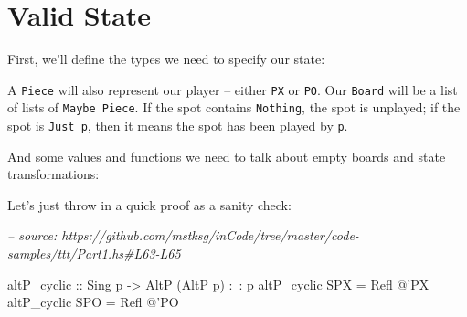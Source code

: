 \documentclass[]{article}
\newenvironment{Shaded}{}{}
\newcommand{\CommentTok}[1]{\textcolor[rgb]{0.38,0.63,0.69}{\textit{#1}}}
\newcommand{\DataTypeTok}[1]{\textcolor[rgb]{0.56,0.13,0.00}{#1}}
\newcommand{\FunctionTok}[1]{\textcolor[rgb]{0.02,0.16,0.49}{#1}}
\newcommand{\NormalTok}[1]{#1}
\newcommand{\OtherTok}[1]{\textcolor[rgb]{0.00,0.44,0.13}{#1}}
\begin{document}
\hypertarget{valid-state}{%
\section{Valid State}\label{valid-state}}

First, we'll define the types we need to specify our state:

\begin{Shaded}
\end{Shaded}

A \texttt{Piece} will also represent our player -- either \texttt{PX} or
\texttt{PO}. Our \texttt{Board} will be a list of lists of
\texttt{Maybe\ Piece}. If the spot contains \texttt{Nothing}, the spot is
unplayed; if the spot is \texttt{Just\ p}, then it means the spot has been
played by \texttt{p}.

And some values and functions we need to talk about empty boards and state
transformations:

\begin{Shaded}
\end{Shaded}

Let's just throw in a quick proof as a sanity check:

\begin{Shaded}
\begin{Highlighting}[]
\CommentTok{-- source: https://github.com/mstksg/inCode/tree/master/code-samples/ttt/Part1.hs#L63-L65}

\OtherTok{altP_cyclic ::} \DataTypeTok{Sing}\NormalTok{ p }\OtherTok{->} \DataTypeTok{AltP}\NormalTok{ (}\DataTypeTok{AltP}\NormalTok{ p) }\FunctionTok{:~:}\NormalTok{ p}
\NormalTok{altP_cyclic }\DataTypeTok{SPX} \FunctionTok{=} \DataTypeTok{Refl} \FunctionTok{@}\NormalTok{'}\DataTypeTok{PX}
\NormalTok{altP_cyclic }\DataTypeTok{SPO} \FunctionTok{=} \DataTypeTok{Refl} \FunctionTok{@}\NormalTok{'}\DataTypeTok{PO}
\end{Highlighting}
\end{Shaded}
\end{document}
